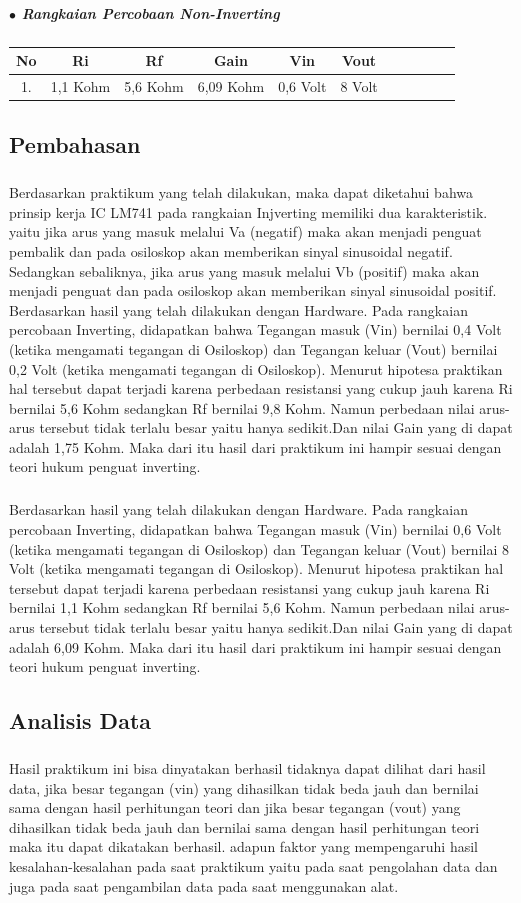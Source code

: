 \documentclass[12pt,a4paper]{article}
\begin{document}
\subparagraph*{$\bullet$ Rangkaian Percobaan Non-Inverting }
\subparagraph*{ }
\begin{tabular}{|c|c|c|c|c|c|c|c|c|c|c|}        \hline
No & Ri       & Rf       & Gain      & Vin       & Vout            \\ \hline 
1. & 1,1 Kohm & 5,6 Kohm & 6,09 Kohm & 0,6 Volt  & 8 Volt \\ \hline
 \end{tabular}




\newpage
\subsection{Pembahasan}
\subparagraph{ }
	Berdasarkan praktikum yang telah dilakukan, maka dapat diketahui bahwa prinsip kerja IC LM741 pada rangkaian Injverting memiliki dua karakteristik. yaitu jika arus yang masuk melalui Va (negatif) maka akan menjadi penguat pembalik dan pada osiloskop akan memberikan sinyal sinusoidal negatif. Sedangkan sebaliknya, jika arus yang masuk melalui Vb (positif) maka akan menjadi penguat dan pada osiloskop akan memberikan sinyal sinusoidal positif.
	Berdasarkan hasil yang telah dilakukan dengan Hardware. Pada rangkaian percobaan Inverting, didapatkan bahwa Tegangan masuk (Vin) bernilai 0,4 Volt (ketika mengamati tegangan di Osiloskop) dan Tegangan keluar (Vout) bernilai 0,2 Volt (ketika mengamati tegangan di Osiloskop). Menurut hipotesa praktikan hal tersebut dapat terjadi karena perbedaan resistansi yang cukup jauh karena Ri bernilai 5,6 Kohm sedangkan Rf bernilai 9,8 Kohm. Namun perbedaan nilai arus-arus tersebut tidak terlalu besar yaitu hanya sedikit.Dan nilai Gain yang di dapat adalah 1,75 Kohm. Maka dari itu hasil dari praktikum ini hampir sesuai dengan teori hukum penguat inverting.
\subparagraph{ }
	Berdasarkan hasil yang telah dilakukan dengan Hardware. Pada rangkaian percobaan Inverting, didapatkan bahwa Tegangan masuk (Vin) bernilai 0,6 Volt (ketika mengamati tegangan di Osiloskop) dan Tegangan keluar (Vout) bernilai 8 Volt (ketika mengamati tegangan di Osiloskop). Menurut hipotesa praktikan hal tersebut dapat terjadi karena perbedaan resistansi yang cukup jauh karena Ri bernilai 1,1 Kohm sedangkan Rf bernilai 5,6 Kohm. Namun perbedaan nilai arus-arus tersebut tidak terlalu besar yaitu hanya sedikit.Dan nilai Gain yang di dapat adalah 6,09 Kohm. Maka dari itu hasil dari praktikum ini hampir sesuai dengan teori hukum penguat inverting.
\newpage
 
\subsection{Analisis Data}
\subparagraph{}
	Hasil praktikum ini bisa dinyatakan berhasil tidaknya dapat dilihat dari hasil data, jika besar tegangan (vin) yang dihasilkan tidak beda jauh dan bernilai sama dengan hasil perhitungan teori dan jika besar tegangan (vout) yang dihasilkan tidak beda jauh dan bernilai sama dengan hasil perhitungan teori maka itu dapat dikatakan berhasil. adapun faktor yang mempengaruhi hasil kesalahan-kesalahan pada saat praktikum yaitu pada saat pengolahan data dan juga pada saat pengambilan data pada saat menggunakan alat.
 
\end{document}
